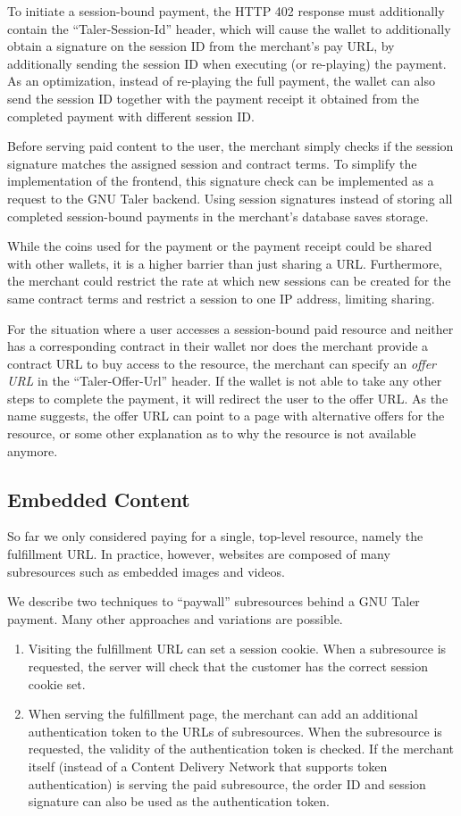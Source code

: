 To initiate a session-bound payment, the HTTP 402 response must additionally
contain the ``Taler-Session-Id'' header, which will cause the wallet to
additionally obtain a signature on the session ID from the merchant's pay URL,
by additionally sending the session ID when executing (or re-playing) the
payment.
As an optimization, instead of re-playing the full payment, the wallet can also
send the session ID together with the payment receipt it obtained from the
completed payment with different session ID.

Before serving paid content to the user, the merchant simply checks if the
session signature matches the assigned session and contract terms.  To simplify
the implementation of the frontend, this signature check can be implemented as
a request to the GNU Taler backend.  Using session signatures instead of storing
all completed session-bound payments in the merchant's database saves storage.

While the coins used for the payment or the payment receipt could be shared
with other wallets, it is a higher barrier than just sharing a URL.  Furthermore, the
merchant could restrict the rate at which new sessions can be created for the
same contract terms and restrict a session to one IP address, limiting sharing.

For the situation where a user accesses a session-bound paid resource and
neither has a corresponding contract in their wallet nor does the merchant
provide a contract URL to buy access to the resource, the merchant can specify
an \emph{offer URL} in the ``Taler-Offer-Url'' header.  If the wallet is not
able to take any other steps to complete the payment, it will redirect the user
to the offer URL.  As the name suggests, the offer URL can point to a page with
alternative offers for the resource, or some other explanation as to why the
resource is not available anymore.

\subsection{Embedded Content}
So far we only considered paying for a single, top-level resource,
namely the fulfillment URL.  In practice, however, websites are composed of
many subresources such as embedded images and videos.

We describe two techniques to ``paywall'' subresources behind a GNU Taler
payment.  Many other approaches and variations are possible.
\begin{enumerate}
  \item Visiting the fulfillment URL can set a session cookie.  When a
    subresource is requested, the server will check that the customer has the
    correct session cookie set.
  \item When serving the fulfillment page, the merchant can add an additional
    authentication token to the URLs of subresources.  When the subresource is
    requested, the validity of the authentication token is checked.  If the
    merchant itself (instead of a Content Delivery Network that supports token
    authentication) is serving the paid subresource, the order ID and session
    signature can also be used as the authentication token.
\end{enumerate}


